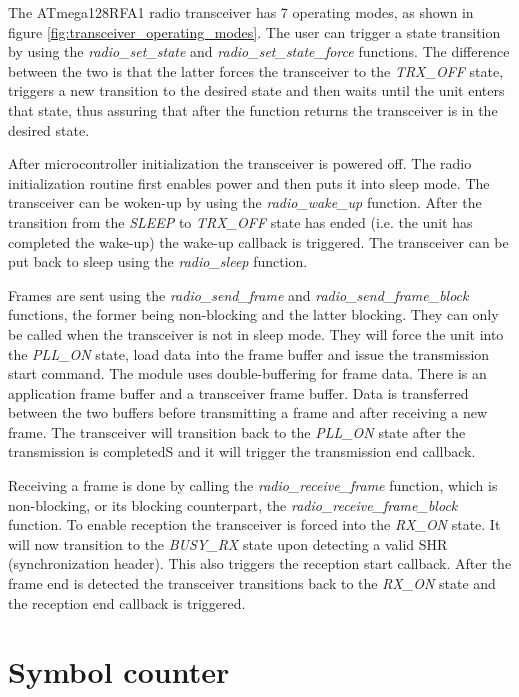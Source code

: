 The \mbox{ATmega128RFA1} radio transceiver has 7 operating modes, as shown in
figure \ref{fig:transceiver_operating_modes}. The user can trigger a state
transition by using the \emph{radio\_set\_state} and
\emph{radio\_set\_state\_force} functions. The difference between the two is
that the latter forces the transceiver to the \emph{TRX\_OFF} state, triggers a
new transition to the desired state and then waits until the unit enters that
state, thus assuring that after the function returns the transceiver is in the
desired state.

After microcontroller initialization the transceiver is powered off. The radio
initialization routine first enables power and then puts it into sleep mode.
The transceiver can be
woken-up by using the \emph{radio\_wake\_up} function. After the transition
from the \emph{SLEEP} to \emph{TRX\_OFF} state has ended (i.e. the unit has
completed the wake-up) the wake-up callback is triggered. The transceiver can
be put back to sleep using the \emph{radio\_sleep} function.

Frames are sent using the \emph{radio\_send\_frame} and
\emph{radio\_send\_frame\_block} functions, the former being non-blocking and
the latter blocking. They can only be called when the transceiver is not in
sleep mode. They will force the unit into the \emph{PLL\_ON} state, load data
into the frame buffer and issue the transmission start command. The module uses
double-buffering for frame data. There is an application frame buffer and a
transceiver frame buffer. Data is transferred between the two buffers before
transmitting a frame and after receiving a new frame. The transceiver will
transition back to the \emph{PLL\_ON} state after the transmission is completedS
and it will trigger the transmission end callback.

Receiving a frame is done by calling the \emph{radio\_receive\_frame} function,
which is non-blocking, or its blocking counterpart,
the \emph{radio\_receive\_frame\_block} function. To enable reception the
transceiver is forced into the \emph{RX\_ON} state. It will now transition to
the \emph{BUSY\_RX} state upon detecting a valid SHR (synchronization header).
This also triggers the reception start callback. After the frame end is
detected the transceiver transitions back to the \emph{RX\_ON} state and the
reception end callback is triggered.

\section{Symbol counter}

